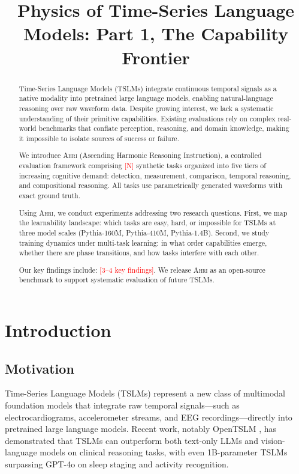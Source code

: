\documentclass[11pt]{article}
\title{Physics of Time-Series Language Models: Part 1, The Capability Frontier}
\author{\placeholder{Authors}}
\date{}
\newcommand{\ahri}{\textsc{Ahri}}
\newcommand{\placeholder}[1]{\textcolor{red}{[#1]}}
\begin{document}
\maketitle

\begin{abstract}
Time-Series Language Models (TSLMs) integrate continuous temporal signals as a native modality into pretrained large language models, enabling natural-language reasoning over raw waveform data. Despite growing interest, we lack a systematic understanding of their primitive capabilities. Existing evaluations rely on complex real-world benchmarks that conflate perception, reasoning, and domain knowledge, making it impossible to isolate sources of success or failure.

We introduce \ahri{} (Ascending Harmonic Reasoning Instruction), a controlled evaluation framework comprising \placeholder{N} synthetic tasks organized into five tiers of increasing cognitive demand: detection, measurement, comparison, temporal reasoning, and compositional reasoning. All tasks use parametrically generated waveforms with exact ground truth.

Using \ahri{}, we conduct experiments addressing two research questions. First, we map the learnability landscape: which tasks are easy, hard, or impossible for TSLMs at three model scales (Pythia-160M, Pythia-410M, Pythia-1.4B). Second, we study training dynamics under multi-task learning: in what order capabilities emerge, whether there are phase transitions, and how tasks interfere with each other.

Our key findings include: \placeholder{3--4 key findings}. We release \ahri{} as an open-source benchmark to support systematic evaluation of future TSLMs.
\end{abstract}

\section{Introduction}
\label{sec:intro}

\subsection{Motivation}

Time-Series Language Models (TSLMs) represent a new class of multimodal foundation models that integrate raw temporal signals---such as electrocardiograms, accelerometer streams, and EEG recordings---directly into pretrained large language models. Recent work, notably OpenTSLM \citep{langer2025opentslm}, has demonstrated that TSLMs can outperform both text-only LLMs and vision-language models on clinical reasoning tasks, with even 1B-parameter TSLMs surpassing GPT-4o on sleep staging and activity recognition.
\end{document}
